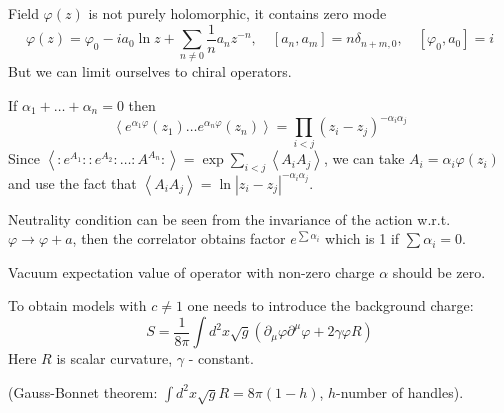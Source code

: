 \documentclass[12pt]{article}
\begin{document}
Field $\varphi(z)$ is not purely holomorphic, it contains zero mode
\begin{equation}
  \label{eq:43}
  \varphi(z)=\varphi_{0}-ia_{0}\ln z+\sum_{n\neq 0}\frac{1}{n}a_{n} z^{-n},\quad
  [a_{n},a_{m}]=n\delta_{n+m,0}, \quad [\varphi_{0},a_{0}]=i
\end{equation}
But we can limit ourselves to chiral operators.

If $\alpha_{1}+\dots+\alpha_{n}=0$ then 
\begin{equation}
  \label{eq:41}
  \left<e^{\alpha_{1}\varphi}(z_{1})\dots e^{\alpha_{n}\varphi}(z_{n})\right> = \prod_{i<j}(z_{i}-z_{j})^{-\alpha_{i}\alpha_{j}}
\end{equation}
Since $\left< :e^{A_{1}}::e^{A_{2}}:\dots :A^{A_{n}}:\right> =
\exp\sum_{i<j}\left<A_{i}A_{j}\right>$, we can take $A_{i}=\alpha_{i}\varphi(z_{i})$ and use the
fact that $\left<A_{i}A_{j}\right>=\ln |z_{i}-z_{j}|^{-\alpha_{i}\alpha_{j}}$. 

Neutrality condition can be seen from the invariance of the action w.r.t. $\varphi\to\varphi+a$,
then the correlator obtains factor $e^{\sum \alpha_{i}}$ which is 1 if $\sum \alpha_{i}=0$.

Vacuum expectation value of operator with non-zero charge $\alpha$ should be zero. 

To obtain models with $c\neq 1$ one needs to introduce the background charge:
\begin{equation}
  \label{eq:44}
  S=\frac{1}{8\pi} \int d^{2}x \sqrt{g} (\partial_{\mu}\varphi\partial^{\mu}\varphi+2\gamma\varphi R)
\end{equation}
Here $R$ is scalar curvature, $\gamma$ - constant. 

(Gauss-Bonnet theorem: $\int d^{2}x \sqrt{g} R = 8\pi(1-h)$, $h$-number of handles).
\end{document}
